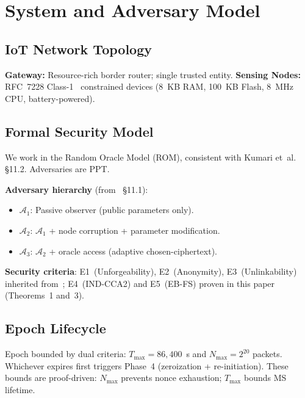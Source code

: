 \documentclass[conference]{IEEEtran}
\newcommand{\Nmax}{N_{\max}}
\newcommand{\Tmax}{T_{\max}}
\begin{document}
\section{System and Adversary Model}
\label{sec:model}

\subsection{IoT Network Topology}

\textbf{Gateway:} Resource-rich border router; single trusted entity.
\textbf{Sensing Nodes:} RFC~7228 Class-1~\cite{rfc7228} constrained
devices (8~KB RAM, 100~KB Flash, 8~MHz CPU, battery-powered).

\subsection{Formal Security Model}

We work in the Random Oracle Model (ROM), consistent with Kumari et~al.~\cite{kumari2022} \S11.2. Adversaries are PPT.

\textbf{Adversary hierarchy} (from~\cite{kumari2022} \S11.1):
\begin{itemize}
  \item $\mathcal{A}_1$: Passive observer (public parameters only).
  \item $\mathcal{A}_2$: $\mathcal{A}_1$ + node corruption + parameter modification.
  \item $\mathcal{A}_3$: $\mathcal{A}_2$ + oracle access (adaptive chosen-ciphertext).
\end{itemize}

\textbf{Security criteria}: E1~(Unforgeability), E2~(Anonymity),
E3~(Unlinkability) inherited from~\cite{kumari2022}; E4~(IND-CCA2)
and E5~(EB-FS) proven in this paper (Theorems~1 and~3).

\subsection{Epoch Lifecycle}

Epoch bounded by dual criteria: $\Tmax = 86{,}400$~s and
$\Nmax = 2^{20}$ packets. Whichever expires first triggers Phase~4
(zeroization + re-initiation). These bounds are proof-driven:
$\Nmax$ prevents nonce exhaustion; $\Tmax$ bounds MS lifetime.
\end{document}
